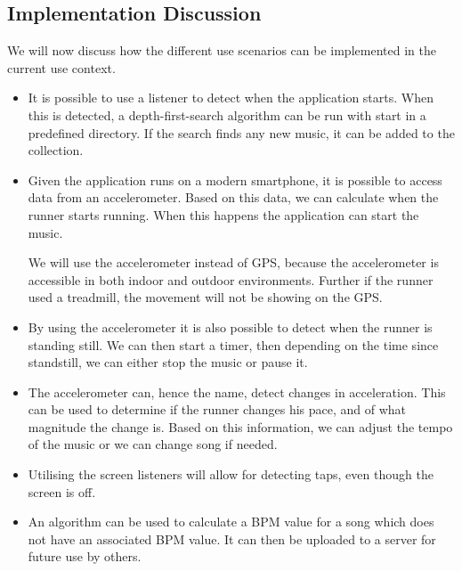 \subsection{Implementation Discussion}
We will now discuss how the different use scenarios can be implemented in the current use context.
\begin{itemize}
	\item It is possible to use a listener to detect when the application starts. When this is detected, a depth-first-search algorithm can be run with start in a predefined directory. If the search finds any new music, it can be added to the collection.
	
	\item Given the application runs on a modern smartphone, it is possible to access data from an accelerometer. Based on this data, we can calculate when the runner starts running. When this happens the application can start the music.
	
	We will use the accelerometer instead of GPS, because the accelerometer is accessible in both indoor and outdoor environments. Further if the runner used a treadmill, the movement will not be showing on the GPS.
	
	\item By using the accelerometer it is also possible to detect when the runner is standing still. We can then start a timer, then depending on the time since standstill, we can either stop the music or pause it.
	
	\item The accelerometer can, hence the name, detect changes in acceleration.
	This can be used to determine if the runner changes his pace, and of what magnitude the change is.
	Based on this information, we can adjust the tempo of the music or we can change song if needed.
	
	\item Utilising the screen listeners will allow for detecting taps, even though the screen is off.
	
	\item An algorithm can be used to calculate a BPM value for a song which does not have an associated BPM value. It can then be uploaded to a server for future use by others. 
\end{itemize}
